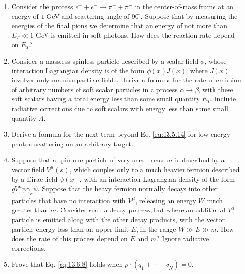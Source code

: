 

\begin{enumerate}
\item Consider the process $e^+ + e^- \to \pi^+ + \pi^-$ in the center-of-mass
frame at an energy of $1$ GeV and scattering angle of $90^\circ$. Suppose that
by measuring the energies of the final pions we determine that an energy of not
more than $E_T \ll 1$ GeV is emitted in soft photons. How does the reaction rate
depend on $E_T$?

\item Consider a massless spinless particle described by a scalar field $\phi$,
whose interaction Lagrangian density is of the form $\phi(x)J(x)$, where $J(x)$
involves only massive particle fields. Derive a formula for the rate of emission
of arbitrary numbers of soft scalar particles in a process $\alpha\to\beta$,
with these soft scalars having a total energy less than some small quantity
$E_T$. Include radiative corrections due to soft scalars with energy less than
some small quantity $\Lambda$.

\item Derive a formula for the next term beyond Eq.
\eqref{eq:13.5.14} for
low-energy photon scattering on an arbitrary target.

\item Suppose that a spin one particle of very small mass $m$ is described by a
vector field $V^\mu(x)$, which couples only to a much heavier fermion described
by a Dirac field $\psi(x)$, with an interaction Lagrangian density of the form
$g V^\mu \bar\psi\gamma_\mu\psi$. Suppose that the heavy fermion normally decays
into other particles that have no interaction with $V^\mu$, releasing an energy
$W$ much greater than $m$. Consider such a decay process, but where an
additional $V^\mu$ particle is emitted along with the other decay products,
with the vector particle energy less than an upper limit $E$, in the range
$W\gg E\gg m$. How does the rate of this process depend on $E$ and $m$? Ignore
radiative corrections.

\item Prove that Eq. \eqref{eq:13.6.8} holds when
$p\cdot(q_1+\cdots+q_N)=0$.
\end{enumerate}


